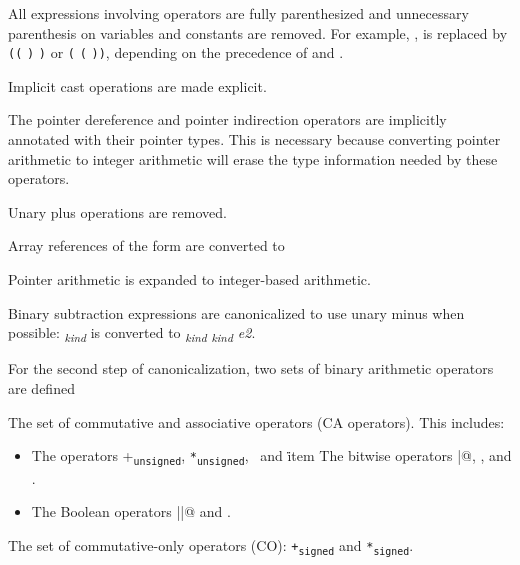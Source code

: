 \begin{compactenum}
\item
  All expressions involving operators are fully parenthesized and
  unnecessary parenthesis on variables and constants are removed. For
  example,     , is
  replaced by \texttt{((}  \texttt{)}
   \texttt{)} or \texttt{(} 
  \texttt{(}  \texttt{))}, depending on the
  precedence of  and .
\item
  Implicit cast operations are made explicit.
\item
  The pointer dereference \code{*} and pointer indirection operators
  \code{(->)} are implicitly annotated with their pointer types.
  This is necessary because converting pointer arithmetic to integer
  arithmetic will erase the type information needed by these operators.
\item
  Unary plus operations are removed.
\item
  Array references of the form
  \code{[}\code{]} are converted to
  \code{*((}\code{)} \code{+}
  \code{(}\code{))}
\item
  Pointer arithmetic is expanded to integer-based arithmetic.
\item
  Binary subtraction expressions are canonicalized to use unary minus
  when possible:  \code{-}\emph{\textsubscript{kind}}
   is converted to 
  \code{+}\emph{\textsubscript{kind}}
  \code{-}\emph{\textsubscript{kind} e2}.
\end{compactenum}

For the second step of canonicalization, two sets of binary arithmetic
operators are defined

\begin{compactitem}
\item
  The set of commutative and associative operators (CA operators).
  This includes:

  \begin{itemize}
  \item
    The operators +\texttt{\textsubscript{unsigned}},
    \texttt{*\textsubscript{unsigned}}, \plusovf\,
    and \mulovf\.
  item
    The bitwise operators \lstinline@|@, \code{&}, and
    \code{^}.
  \item
    The Boolean operators \lstinline@||@ and \code{&&}.
  \end{itemize}
\item
  The set of commutative-only operators (CO):
  \texttt{+\textsubscript{signed}} and \texttt{*\textsubscript{signed}}.
\end{compactitem}

